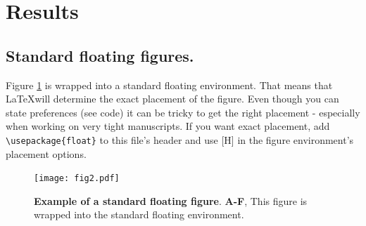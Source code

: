 \documentclass[10pt,letterpaper]{article}
\begin{document}
\newpage

\section*{Results}
\subsection*{Standard floating figures.}
Figure \ref{fig2} is wrapped into a standard floating environment. That means that \LaTeX will determine the exact placement of the figure. Even though you can state preferences (see code) it can be tricky to get the right placement - especially when working on very tight manuscripts. If you want exact placement, add \verb!\usepackage{float}! to this file's header and use [H] in the figure environment's placement options.


\begin{figure}[ht] %


\texttt{[image: fig2.pdf]}

\caption{\color{Gray} \textbf{Example of a standard floating figure}. \textbf{A-F}, This figure is wrapped into the standard floating environment.}

\label{fig2} %

\end{figure}
\end{document}
